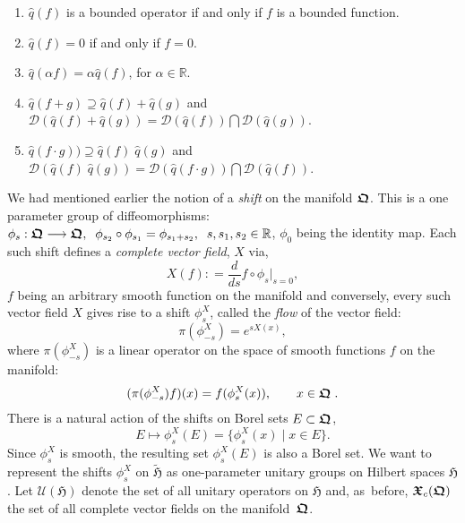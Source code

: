 \documentclass[12pt]{amsart}
\numberwithin{equation}{section}
\theoremstyle{remark}
\newcommand\HH{\mathfrak H}
\newcommand{\be}{\begin{equation}}
\newcommand{\en}{\end{equation}}
\newcommand{\htil}{\widetilde{\mathfrak H}}
\newcommand{\bfrakQ}{\mbox{\boldmath $\mathfrak Q$}}
\newcommand{\bfrakX}{\mbox{\boldmath $\mathfrak X$}}
\begin{document}
\begin{enumerate}

\item $\widehat q (f)$ is a bounded operator if and only if $f$ is a bounded
function.

\item $\widehat q (f) = 0$ if and only if $f = 0$.

\item $\widehat q (\alpha f) = \alpha \widehat q (f)$, for
$\alpha \in \mathbb R$.

\item $\widehat q (f + g )   \supseteq \widehat q (f)  +\widehat q (g)$ and
      ${\mathcal D}(\widehat q (f) + \widehat q (g))
 = {\mathcal D}(\widehat q (f)) \bigcap {\mathcal D}(\widehat q (g))$.


\item $\widehat q (f\cdot g)) \supseteq \widehat q (f)\;\widehat q (g)$ and
      ${\mathcal D}(\widehat q (f)\;\widehat q (g)) =
      {\mathcal D}(\widehat q (f\cdot g ))\bigcap{\mathcal D}(\widehat q (f))$.

\end{enumerate}

We had mentioned earlier the notion of a {\em shift} on the manifold $\bfrakQ$.
This is a one parameter group of diffeomorphisms:
$\phi_s : \bfrakQ \longrightarrow \bfrakQ, \;\;
\phi_{s_2}\circ\phi_{s_1} = \phi_{s_1 + s_2}, \;\; s, s_1 , s_2 \in \mathbb R$,
$\phi_0$ being the identity map. Each such shift defines a {\em complete vector
field\/}, $X$ via,
\be
   X(f) : = \frac d{ds} f\circ \phi_s \vert_{s=0} ,
\label{vectfield1}
\en
$f$ being an arbitrary smooth function on the manifold and conversely,
every such vector field $X$ gives rise to a shift $\phi^X_s$, called the
{\em flow} of the vector field:
\be
   \pi(\phi^X_{-s} ) = e^{sX(x)},
\label{vectfield2}
\en
where $\pi(\phi^X_{-s} )$ is a linear operator on the space of smooth functions
$f$ on the manifold:
\be
  (\pi(\phi^X_{-s} )f)(x) = f(\phi^X_{s}(x)), \qquad x \in \bfrakQ\; .
\label{morevectfield}
\en
There is a natural action of the shifts on Borel sets $E \subset \bfrakQ$,
\be
   E \longmapsto \phi^X_s (E) = \{ \phi^X_s (x) \;\vert\; x \in E\} .
\label{shift}
\en
Since $\phi^X_s$ is smooth, the resulting set $\phi^X_s (E)$ is also a Borel
set. We want to represent the shifts $\phi^X_s$ on $\htil$ as one-parameter
unitary groups on Hilbert spaces $\HH$. Let ${\mathcal U}(\HH )$ denote the set
of all unitary operators on $\HH$ and, as~before, ${\bfrakX}_c (\bfrakQ )$ the
set of all complete vector fields on the manifold~$\bfrakQ$.
\end{document}
